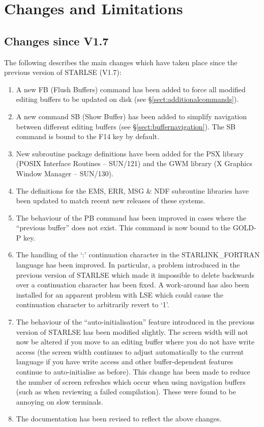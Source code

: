 \newpage
\section{Changes and Limitations}

\subsection{Changes since V1.7}

The following describes the main changes which have taken place since the
previous version of STARLSE (V1.7):

\begin{enumerate}

\item A new FB (Flush Buffers) command has been added to force all modified
editing buffers to be updated on disk (see \S\ref{sect:additionalcommands}).

\item A new command SB (Show Buffer) has been added to simplify navigation
between different editing buffers (see \S\ref{sect:buffernavigation}). The SB
command is bound to the F14 key by default.

\item New subroutine package definitions have been added for the PSX library
(POSIX Interface Routines -- SUN/121) and the GWM library (X Graphics Window
Manager -- SUN/130).

\item The definitions for the EMS, ERR, MSG \& NDF subroutine libraries have
been updated to match recent new releases of these systems.

\item The behaviour of the PB command has been improved in cases where the
``previous buffer'' does not exist. This command is now bound to the GOLD-P
key.

\item The handling of the `:' continuation character in the STARLINK\_FORTRAN
language has been improved. In particular, a problem introduced in the previous
version of STARLSE which made it impossible to delete backwards over a
continuation character has been fixed. A work-around has also been installed for
an apparent problem with LSE which could cause the continuation character to
arbitrarily revert to `1'.

\item The behaviour of the ``auto-initialisation'' feature introduced in the
previous version of STARLSE has been modified slightly. The screen width will
not now be altered if you move to an editing buffer where you do not have write
access (the screen width continues to adjust automatically to the current
language if you have write access and other buffer-dependent features continue
to auto-initialise as before). This change has been made to reduce the number
of screen refreshes which occur when using navigation buffers (such as when
reviewing a failed compilation). These were found to be annoying on slow
terminals.

\item The documentation has been revised to reflect the above changes.

\end{enumerate}
